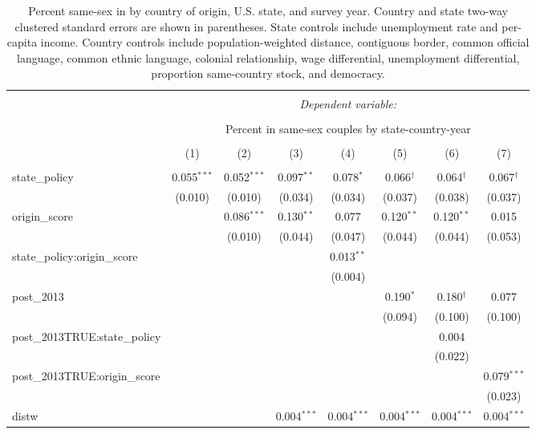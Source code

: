 \documentclass[
  11pt,
]{article}
\begin{document}
\begin{table}[!htbp] \centering 
  \caption{Percent same-sex in by country of origin, U.S. state, and survey year. Country and state two-way clustered standard errors are shown in parentheses. State controls include unemployment rate and per-capita income. Country controls include population-weighted distance, contiguous border, common official language, common ethnic language, colonial relationship, wage differential, unemployment differential, proportion same-country stock, and democracy.} 
  \label{tab:state-props-full} 
\footnotesize 
\begin{tabular}{@{\extracolsep{2pt}}lccccccc} 
\\[-1.8ex]\hline 
\hline \\[-1.8ex] 
 & \multicolumn{7}{c}{\textit{Dependent variable:}} \\ 
\cline{2-8} 
\\[-1.8ex] & \multicolumn{7}{c}{Percent in same-sex couples by state-country-year} \\ 
\\[-1.8ex] & (1) & (2) & (3) & (4) & (5) & (6) & (7)\\ 
\hline \\[-1.8ex] 
 state\_policy & 0.055$^{***}$ & 0.052$^{***}$ & 0.097$^{**}$ & 0.078$^{*}$ & 0.066$^{†}$ & 0.064$^{†}$ & 0.067$^{†}$ \\ 
  & (0.010) & (0.010) & (0.034) & (0.034) & (0.037) & (0.038) & (0.037) \\ 
  origin\_score &  & 0.086$^{***}$ & 0.130$^{**}$ & 0.077 & 0.120$^{**}$ & 0.120$^{**}$ & 0.015 \\ 
  &  & (0.010) & (0.044) & (0.047) & (0.044) & (0.044) & (0.053) \\ 
  state\_policy:origin\_score &  &  &  & 0.013$^{**}$ &  &  &  \\ 
  &  &  &  & (0.004) &  &  &  \\ 
  post\_2013 &  &  &  &  & 0.190$^{*}$ & 0.180$^{†}$ & 0.077 \\ 
  &  &  &  &  & (0.094) & (0.100) & (0.100) \\ 
  post\_2013TRUE:state\_policy &  &  &  &  &  & 0.004 &  \\ 
  &  &  &  &  &  & (0.022) &  \\ 
  post\_2013TRUE:origin\_score &  &  &  &  &  &  & 0.079$^{***}$ \\ 
  &  &  &  &  &  &  & (0.023) \\ 
  distw &  &  & 0.004$^{***}$ & 0.004$^{***}$ & 0.004$^{***}$ & 0.004$^{***}$ & 0.004$^{***}$ \\ 

\end{tabular}
\end{table}
\end{document}
